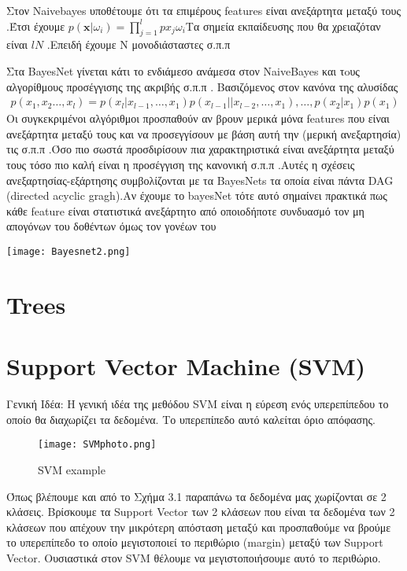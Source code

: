  Στον  Naivebayes υποθέτουμε ότι τα επιμέρους features είναι ανεξάρτητα μεταξύ τους .Έτσι έχουμε  $p(\mathbf{x}|\omega_i) = \prod_{j=1}^lp{x_j}{\omega_i} $Τα σημεία εκπαίδευσης που  θα χρειαζόταν 
 είναι  $lN$ .Επειδή έχουμε Ν μονοδιάσταστες σ.π.π  
 
Στα BayesΝet γίνεται κάτι το ενδιάμεσο ανάμεσα στον NaiveBayes και τoυς αλγορίθμους προσέγγισης της ακριβής σ.π.π . Βασιζόμενος στον κανόνα της αλυσίδας \\
\begin{align*}
p(x_1,x_2 \ldots ,x_l)  = p(x_l|x_{l-1},\ldots,x_1)p(x_{l-1}||x_{l-2},\ldots,x_1),\ldots,p(x_2|x_1)p(x_1)
\end{align*} 
Οι συγκεκριμένοι αλγόριθμοι προσπαθούν αν βρουν μερικά μόνα features που είναι ανεξάρτητα μεταξύ τους και να προσεγγίσουν με βάση αυτή την (μερική ανεξαρτησία) τις σ.π.π .Όσο πιο σωστά προσδιρίσουν πια χαρακτηριστικά είναι ανεξάρτητα μεταξύ τους τόσο πιο καλή είναι η προσέγγιση της κανονική σ.π.π .Αυτές η σχέσεις ανεξαρτησίας-εξάρτησης συμβολίζονται με τα BayesNets τα οποία είναι πάντα DAG (directed acyclic gragh).Αν έχουμε το bayesNet τότε αυτό σημαίνει πρακτικά πως κάθε feature  είναι στατιστικά ανεξάρτητο από οποιοδήποτε συνδυασμό τον μη απογόνων του δοθέντων όμως τον γονέων του 
\begin{center}
	\texttt{[image: Bayesnet2.png]}
	\label{fig:KNN}  
\end{center}

\section{Trees}


\section{Support Vector Machine (SVM)}


Γενική Ιδέα: H γενική ιδέα της μεθόδου SVM είναι η εύρεση ενός υπερεπίπεδου το οποίο θα διαχωρίζει τα δεδομένα. Το υπερεπίπεδο αυτό καλείται όριο απόφασης. 


\begin{figure}[h!]
	\texttt{[image: SVMphoto.png]}
	\caption {SVM example}
	\label{fig:SVM}  
\end{figure}

Όπως βλέπουμε και από το Σχήμα 3.1 παραπάνω τα δεδομένα μας χωρίζονται σε 2 κλάσεις. Βρίσκουμε τα
 Support Vector των 2 κλάσεων που είναι τα δεδομένα των 2 κλάσεων που απέχουν την μικρότερη απόσταση
  μεταξύ και προσπαθούμε να βρούμε το υπερεπίπεδο το οποίο μεγιστοποιεί το περιθώριο (margin) μεταξύ
   των Support Vector. Ουσιαστικά στον SVM θέλουμε να μεγιστοποιήσουμε αυτό το περιθώριο.


